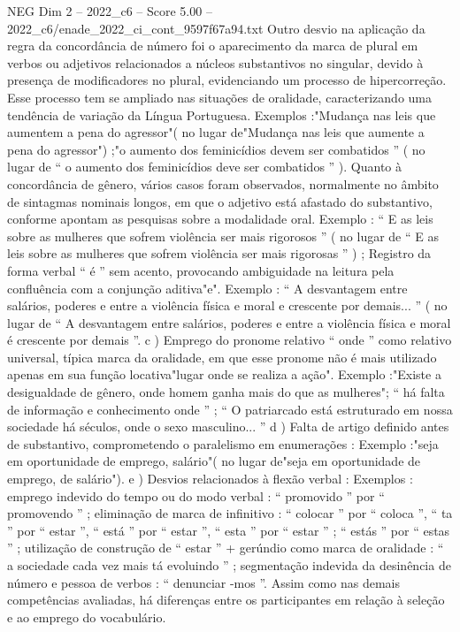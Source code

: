 \begin{textsample}{NEG Dim 2 – 2022\_c6 – Score 5.00 – 2022\_c6/enade\_2022\_ci\_cont\_9597f67a94.txt}
Outro desvio na aplicação da regra da concordância de número foi o aparecimento da marca de plural em verbos ou adjetivos relacionados a núcleos substantivos no singular, devido à presença de modificadores no plural, evidenciando um processo de hipercorreção.
Esse processo tem se ampliado nas situações de oralidade, caracterizando uma tendência de variação da Língua Portuguesa.
Exemplos :"Mudança nas leis que aumentem a pena do agressor"( no lugar de"Mudança nas leis que aumente a pena do agressor") ;"o aumento dos feminicídios devem ser combatidos ” ( no lugar de “ o aumento dos feminicídios deve ser combatidos ” ).
Quanto à concordância de gênero, vários casos foram observados, normalmente no âmbito de sintagmas nominais longos, em que o adjetivo está afastado do substantivo, conforme apontam as pesquisas sobre a modalidade oral.
Exemplo : “ E as leis sobre as mulheres que sofrem violência ser mais rigorosos ” ( no lugar de “ E as leis sobre as mulheres que sofrem violência ser mais rigorosas ” ) ; Registro da forma verbal “ é ” sem acento, provocando ambiguidade na leitura pela confluência com a conjunção aditiva"e".
Exemplo : “ A desvantagem entre salários, poderes e entre a violência física e moral e crescente por demais... ” ( no lugar de “ A desvantagem entre salários, poderes e entre a violência física e moral é crescente por demais ”. c ) Emprego do pronome relativo “ onde ” como relativo universal, típica marca da oralidade, em que esse pronome não é mais utilizado apenas em sua função locativa"lugar onde se realiza a ação".
Exemplo :"Existe a desigualdade de gênero, onde homem ganha mais do que as mulheres"; “ há falta de informação e conhecimento onde ” ; “ O patriarcado está estruturado em nossa sociedade há séculos, onde o sexo masculino... ” d ) Falta de artigo definido antes de substantivo, comprometendo o paralelismo em enumerações : Exemplo :"seja em oportunidade de emprego, salário"( no lugar de"seja em oportunidade de emprego, de salário"). e ) Desvios relacionados à flexão verbal : Exemplos : emprego indevido do tempo ou do modo verbal : “ promovido ” por “ promovendo ” ; eliminação de marca de infinitivo : “ colocar ” por “ coloca ”, “ ta ” por “ estar ”, “ está ” por “ estar ”, “ esta ” por “ estar ” ; “ estás ” por “ estas ” ; utilização de construção de “ estar ” + gerúndio como marca de oralidade : “ a sociedade cada vez mais tá evoluindo ” ; segmentação indevida da desinência de número e pessoa de verbos : “ denunciar -mos ”.
Assim como nas demais competências avaliadas, há diferenças entre os participantes em relação à seleção e ao emprego do vocabulário.

\end{textsample}
